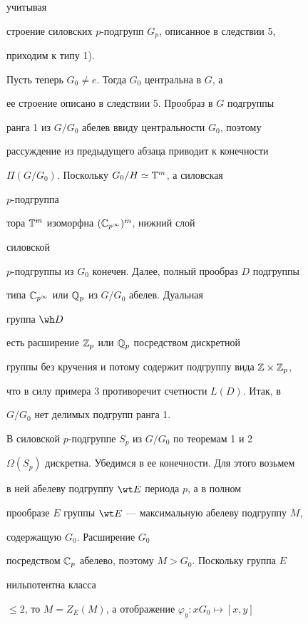 учитывая 


строение силовских $p$-подгрупп $G_p$, описанное в следствии 5, 


приходим к типу 1). 


 


Пусть теперь $G_0\ne e$. Тогда $G_0$ центральна в $G$, а  


ее строение описано в следствии 5. Прообраз в $G$ подгруппы 


ранга 1 из $G/G_0$ абелев ввиду центральности $G_0$, поэтому 


рассуждение из предыдущего абзаца приводит к конечности  


$\Pi(G/G_0)$. Поскольку $G_0/H\simeq\Bbb T^m$, а силовская 


$p$-подгруппа 


тора $\Bbb T^m$ изоморфна $(\Bbb C_{p^\infty})^m$, нижний слой 


силовской  


$p$-подгруппы из $G_0$ конечен. Далее, полный прообраз $D$ подгруппы 


типа $\Bbb C_{p^\infty}$ или $\Bbb Q_p$ из $G/G_0$ абелев. Дуальная 


группа $\wh D$ 


есть расширение $\Bbb Z_p$ или $\Bbb Q_p$ посредством дискретной  


группы без кручения и потому содержит подгруппу вида $\Bbb Z\times\Bbb 


Z_p$, 


что в силу примера 3 противоречит счетности $L(D)$. Итак, в 


$G/G_0$ нет делимых подгрупп ранга 1. 


 


В силовской $p$-подгруппе $S_p$ из $G/G_0$ по теоремам 1 и 2\; 


$\Omega(S_p)$ дискретна. Убедимся в ее конечности. Для этого возьмем 


в ней абелеву подгруппу $\wt E$ периода $p$, а в полном  


прообразе $E$ группы $\wt E$ --- максимальную абелеву подгруппу $M$, 


содержащую $G_0$. Расширение $G_0$ 


посредством $\Bbb C_p$ абелево, поэтому $M>G_0$. Поскольку группа $E$ 


нильпотентна класса 


$\le2$, то $M=Z_E(M)$, а отображение $\varphi_y:xG_0\mapsto[x,y]$ 


